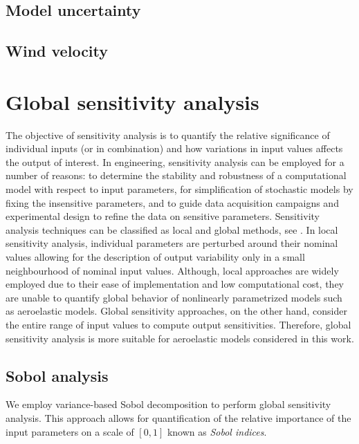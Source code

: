 \documentclass[review]{elsarticle}
\numberwithin{equation}{section}
\numberwithin{equation}{section}
\begin{document}
\subsection{Model uncertainty}
\subsection{Wind velocity}

\section{Global sensitivity analysis}\label{sec:GSA}
The objective of sensitivity analysis is to quantify the relative significance of individual inputs (or in combination) and how variations in input values affects the output of interest. In engineering, sensitivity analysis can be employed for a number of reasons: to determine the stability and robustness of a computational model with respect to input parameters, for simplification of stochastic models by fixing the insensitive parameters, and to guide data acquisition campaigns and experimental design to refine the data on sensitive parameters. Sensitivity analysis techniques can be classified as local and global methods, see \cite{RSmith}. In local sensitivity analysis, individual parameters are perturbed around their nominal values allowing for the description of output variability only in a small neighbourhood of nominal input values. Although, local approaches are widely employed due to their ease of implementation and low computational cost, they are unable to quantify global behavior of nonlinearly parametrized models such as aeroelastic models. Global sensitivity approaches, on the other hand, consider the entire range of input values to compute output sensitivities. Therefore, global sensitivity analysis is more suitable for aeroelastic models considered in this work.  

\subsection{Sobol analysis}
We employ variance-based Sobol decomposition to perform global sensitivity analysis. This approach allows for quantification of  the relative importance of the input parameters on a scale of $[0,1]$ known as \emph{Sobol indices}. 
\end{document}
